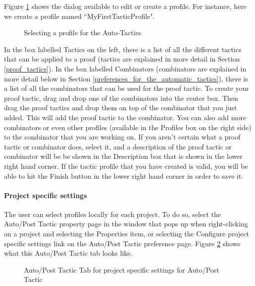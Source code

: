 Figure \ref{fig_ref_01_preferences10} shows the dialog available to edit or create a profile. For instance, here we create a profile named ``MyFirstTacticProfile".
\begin{figure}[!ht]
\begin{center}
	\caption{Selecting a profile for the Auto-Tactics}
	\label{fig_ref_01_preferences10}
\end{center}
\end{figure}

In the box labelled \textsf{Tactics} on the left, there is a list of all the different tactics that can be applied to a proof (tactics are explained in more detail in Section \ref{proof_tactics}). In the box labelled \textsf{Combinators} (combinators are explained in more detail below in Section \ref{preferences_for_the_automatic_tactics}), there is a list of all the combinators that can be used for the proof tactic. To create your proof tactic, drag and drop one of the combinators into the center box. Then drag the proof tactics and drop them on top of the combinator that you just added. This will add the proof tactic to the combinator. You can also add more combinators or even other profiles (available in the \textsf{Profiles} box on the right side) to the combinator that you are working on. If you aren't certain what a proof tactic or combinator does, select it, and a description of the proof tactic or combinator will be be shown in the \textsf{Description} box that is shown in the lower right hand corner. If the tactic profile that you have created is valid, you will be able to hit the \textsf{Finish} button in the lower right hand corner in order to save it.

\paragraph{Project specific settings}

The user can select profiles locally for each project. To do so, select the \textsf{Auto/Post Tactic} property page in the window that pops up when right-clicking on a project and selecting the \textsf{Properties} item, or selecting the \textsf{Configure project specific settings link} on the \textsf{Auto/Post Tactic} preference page. Figure \ref{fig_ref_01_preferences11} shows what this \textsf{Auto/Post Tactic} tab looks like.

\begin{figure}[!ht]
\begin{center}
	\caption{Auto/Post Tactic Tab for project specific settings for Auto/Post Tactic}
	\label{fig_ref_01_preferences11}
\end{center}
\end{figure}


